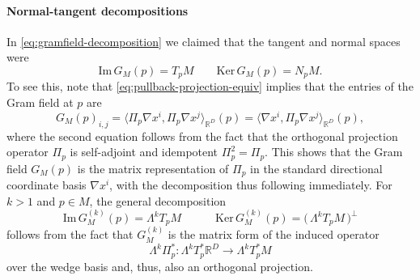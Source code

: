 \documentclass{article}
\newcommand{\R}{\mathbb{R}}
\theoremstyle{remark}
\theoremstyle{plain}
\begin{document}
 \paragraph{Normal-tangent decompositions} In \ref{eq:gramfield-decomposition} we claimed that the tangent and normal spaces were
\begin{equation}
    \text{Im} \,G_M(p) = T_pM \qquad \text{Ker} \, G_M(p) = N_pM.
\end{equation} To see this, note that \ref{eq:pullback-projection-equiv} implies that the entries of the Gram field at $p$ are
\begin{equation}
    G_M(p)_{i,j} = \Big\langle \Pi_p \nabla x^i, \Pi_p \nabla x^j\Big\rangle_{\R^D}(p) = \Big\langle  \nabla x^i, \Pi_p \nabla x^j\Big\rangle_{\R^D}(p),
\end{equation} where the second equation follows from the fact that the orthogonal projection operator $\Pi_p$ is self-adjoint and idempotent $\Pi_p^2 = \Pi_p$. This shows that the Gram field $G_M(p)$ is the matrix representation of $\Pi_p$ in the standard directional coordinate basis $\nabla x^i$, with the decomposition thus following immediately. For $k > 1$ and $p \in M$, the general decomposition
\begin{equation} \label{eq:k-normal-tangent-decomp}
    \text{Im}\,G_M^{(k)}(p) = \Lambda^k T_pM \qquad \quad \text{Ker} \, G_M^{(k)}(p) = \big(\,\Lambda^kT_pM \,\big)^\perp
\end{equation}follows from the fact that $G_M^{(k)}$ is the matrix form of the induced operator
\begin{equation}
    \Lambda^k \Pi_p^* : \Lambda^k T^*_p \R^D \to  \Lambda^kT^*_pM
\end{equation} over the wedge basis and, thus, also an orthogonal projection.
\end{document}
